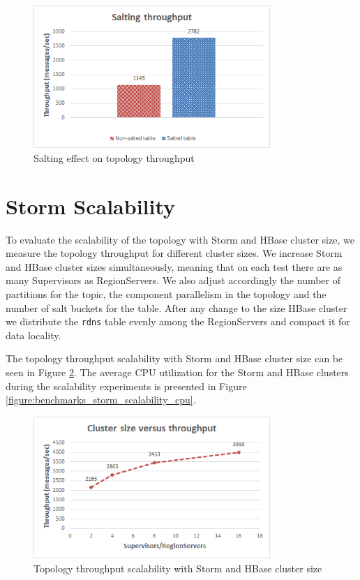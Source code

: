 \begin{figure}[H]
\centering
\includegraphics[width=0.8\textwidth]{figures/benchmarks_storm_salting_throughput}
\caption{Salting effect on topology throughput}
\label{figure:benchmarks_storm_salting_throughput}
\end{figure}


\section{Storm Scalability}\label{section:benchmarks_storm_scalability}

To evaluate the scalability of the topology with Storm and HBase cluster size, we measure the topology throughput for different cluster sizes. We increase Storm and HBase cluster sizes simultaneously, meaning that on each test there are as many Supervisors as RegionServers. We also adjust accordingly the number of partitions for the topic, the component parallelism in the topology and the number of salt buckets for the table. After any change to the size HBase cluster we distribute the \texttt{rdns} table evenly among the RegionServers and compact it for data locality.

The topology throughput scalability with Storm and HBase cluster size can be seen in Figure \ref{figure:benchmarks_storm_scalability_throughput}. The average CPU utilization for the Storm and HBase clusters during the scalability experiments is presented in Figure \ref{figure:benchmarks_storm_scalability_cpu}.

\begin{figure}[H]
\centering
\includegraphics[width=0.8\textwidth]{figures/benchmarks_storm_scalability_throughput}
\caption{Topology throughput scalability with Storm and HBase cluster size}
\label{figure:benchmarks_storm_scalability_throughput}
\end{figure}

